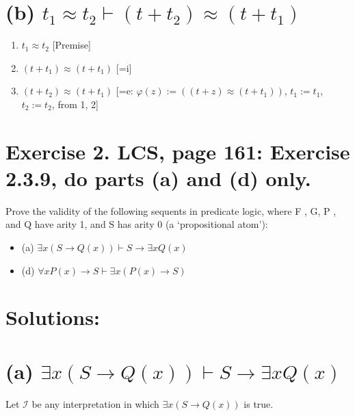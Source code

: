 \documentclass{article}
\newenvironment{proof}
{\begin{mdframed}[linewidth=0.5pt]\begin{enumerate}[label=\arabic*.,leftmargin=*]}
{\end{enumerate}\end{mdframed}}
\begin{document}
\newpage


\section*{(b) $t_1 \approx t_2 \vdash (t + t_2) \approx (t + t_1)$}

\begin{proof}
\begin{enumerate}
    \item $t_1 \approx t_2$ \hfill [Premise]
    \item $(t + t_1) \approx (t + t_1)$ \hfill [=i]
    \item $(t + t_2) \approx (t + t_1)$ \hfill [=e: $\varphi(z) := ((t + z) \approx (t + t_1))$, $t_1 := t_1$, $t_2 := t_2$, from 1, 2]
\end{enumerate}
\end{proof}



\newpage

\section*{Exercise 2. LCS, page 161: Exercise 2.3.9, do parts (a) and (d) only.}
\begin{mdframed}
    Prove the validity of the following sequents in predicate logic, where F , G, P ,
    and Q have arity 1, and S has arity 0 (a ‘propositional atom’):

    \begin{itemize}
        \item (a) $\exists x (S \rightarrow Q(x)) \vdash S \rightarrow \exists x Q(x)$
        \item (d) $\forall x P(x) \rightarrow S \vdash \exists x (P(x) \rightarrow S)$
    \end{itemize}

\end{mdframed}

\section*{Solutions:}


\section*{(a) $\exists x(S \to Q(x)) \vdash S \to \exists xQ(x)$}

Let $\mathcal{I}$ be any interpretation in which $\exists x(S \to Q(x))$ is true.
\end{document}
